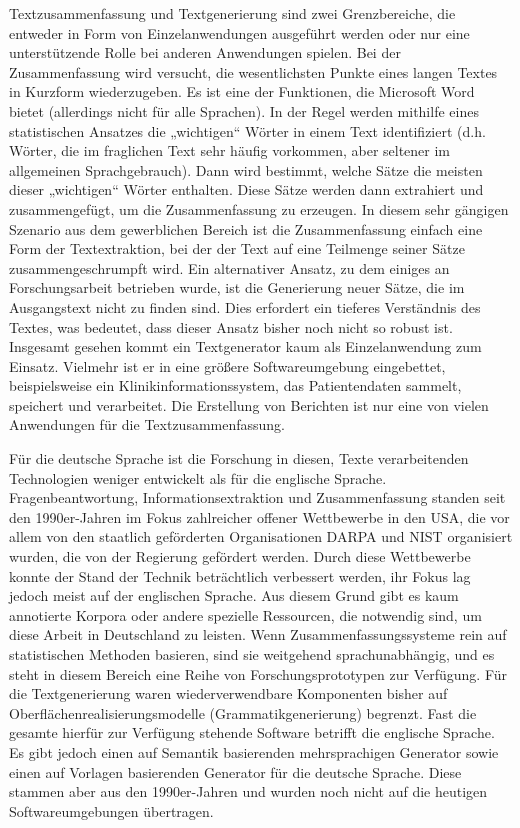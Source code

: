 \documentclass[]{../../metanetpaper}
\begin{document}
\begin{Parallel}[c]{80mm}{80mm}
{Textzusammenfassung und Textgenerierung sind zwei Grenzbereiche, die entweder in Form von Einzelanwendungen ausgeführt werden oder nur eine unterstützende Rolle bei anderen Anwendungen spielen. Bei der Zusammenfassung wird versucht, die wesentlichsten Punkte eines langen Textes in Kurzform wiederzugeben. Es ist eine der Funktionen, die Microsoft Word bietet (allerdings nicht für alle Sprachen). In der Regel werden mithilfe eines statistischen Ansatzes die „wichtigen“ Wörter in einem Text identifiziert (d.h. Wörter, die im fraglichen Text sehr häufig vorkommen, aber seltener im allgemeinen Sprachgebrauch). Dann wird bestimmt, welche Sätze die meisten dieser „wichtigen“ Wörter enthalten. Diese Sätze werden dann extrahiert und zusammengefügt, um die Zusammenfassung zu erzeugen. In diesem sehr gängigen Szenario aus dem gewerblichen Bereich ist die Zusammenfassung einfach eine Form der Textextraktion, bei der der Text auf eine Teilmenge seiner Sätze zusammengeschrumpft wird. Ein alternativer Ansatz, zu dem einiges an Forschungsarbeit betrieben wurde, ist die Generierung neuer Sätze, die im Ausgangstext nicht zu finden sind. Dies erfordert ein tieferes Verständnis des Textes, was bedeutet, dass dieser Ansatz bisher noch nicht so robust ist. Insgesamt gesehen kommt ein Textgenerator kaum als Einzelanwendung zum Einsatz. Vielmehr ist er in eine größere Softwareumgebung eingebettet, beispielsweise ein Klinikinformationssystem, das Patientendaten sammelt, speichert und verarbeitet. Die Erstellung von Berichten ist nur eine von vielen Anwendungen für die Textzusammenfassung. 

Für die deutsche Sprache ist die Forschung in diesen, Texte verarbeitenden Technologien weniger entwickelt als für die englische Sprache. Fragenbeantwortung, Informationsextraktion und Zusammenfassung standen seit den 1990er-Jahren im Fokus zahlreicher offener Wettbewerbe in den USA, die vor allem von den staatlich geförderten Organisationen DARPA und NIST organisiert wurden, die von der Regierung gefördert werden. Durch diese Wettbewerbe konnte der Stand der Technik beträchtlich verbessert werden, ihr Fokus lag jedoch meist auf der englischen Sprache. Aus diesem Grund gibt es kaum annotierte Korpora oder andere spezielle Ressourcen, die notwendig sind, um diese Arbeit in Deutschland zu leisten. Wenn Zusammenfassungssysteme rein auf statistischen Methoden basieren, sind sie weitgehend sprachunabhängig, und es steht in diesem Bereich eine Reihe von Forschungsprototypen zur Verfügung. Für die Textgenerierung waren wiederverwendbare Komponenten bisher auf Oberflächenrealisierungsmodelle (Grammatikgenerierung) begrenzt. Fast die gesamte hierfür zur Verfügung stehende Software betrifft die englische Sprache. Es gibt jedoch einen auf Semantik basierenden mehrsprachigen Generator sowie einen auf Vorlagen basierenden Generator für die deutsche Sprache. Diese stammen aber aus den 1990er-Jahren und wurden noch nicht auf die heutigen Softwareumgebungen übertragen.
  }


\end{Parallel}
\end{document}
